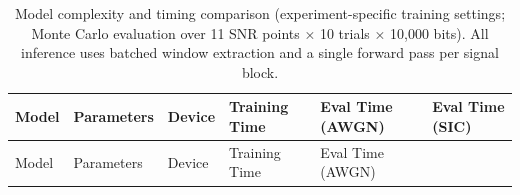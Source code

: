 \documentclass[
  english,
  12pt,
  12pt,
  a4paper,
  oneside]{report}
\begin{document}
\begin{longtable}[]{@{}
  >{\raggedright\arraybackslash}p{}
  >{\raggedright\arraybackslash}p{}
  >{\raggedright\arraybackslash}p{}
  >{\raggedright\arraybackslash}p{}
  >{\raggedright\arraybackslash}p{}
  >{\raggedright\arraybackslash}p{}@{}}
\caption{Model complexity and timing comparison (experiment-specific training settings; Monte Carlo evaluation over 11 SNR points × 10 trials × 10,000 bits). All inference uses batched window extraction and a single forward pass per signal block.}\label{tbl:table13}\tabularnewline
\toprule\noalign{}
\begin{minipage}[b]{\linewidth}\raggedright
Model
\end{minipage} & \begin{minipage}[b]{\linewidth}\raggedright
Parameters
\end{minipage} & \begin{minipage}[b]{\linewidth}\raggedright
Device
\end{minipage} & \begin{minipage}[b]{\linewidth}\raggedright
Training Time
\end{minipage} & \begin{minipage}[b]{\linewidth}\raggedright
Eval Time (AWGN)
\end{minipage} & \begin{minipage}[b]{\linewidth}\raggedright
Eval Time (SIC)
\end{minipage} \\
\midrule\noalign{}
\endfirsthead
\toprule\noalign{}
\begin{minipage}[b]{\linewidth}\raggedright
Model
\end{minipage} & \begin{minipage}[b]{\linewidth}\raggedright
Parameters
\end{minipage} & \begin{minipage}[b]{\linewidth}\raggedright
Device
\end{minipage} & \begin{minipage}[b]{\linewidth}\raggedright
Training Time
\end{minipage} & \begin{minipage}[b]{\linewidth}\raggedright
Eval Time (AWGN)
\end{minipage} & \begin{minipage}[b]{\linewidth}\raggedright

\end{minipage}
\end{longtable}
\end{document}
